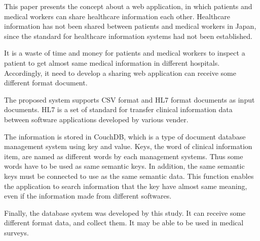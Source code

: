 This paper presents the concept about a web application, in which patients and medical workers can share healthcare information each other.
Healthcare information has not been shared between patients and medical workers in Japan, since the standard for healthcare information systems had not been established.

It is a waste of time and money for patients and medical workers to inspect a patient to get almost same medical information in different hospitals.
Accordingly, it need to develop a sharing web application can receive some different format document.

The proposed system supports CSV format and HL7 format documents as input documents. HL7 is a set of standard for transfer clinical information data between software applications developed by various vender.

The information is stored in CouchDB, which is a type of document database management system using key and value.
Keys, the word of clinical information item, are named as different words by each management systems.
Thus some words have to be used as same semantic keys.
In addition, the same semantic keys must be connected to use as the same semantic data.
This function enables the application to search information that the key have almost same meaning, even if the information made from different softwares.

Finally, the database system was developed by this study.
It can receive some different format data, and collect them.
It may be able to be used in medical surveys.
